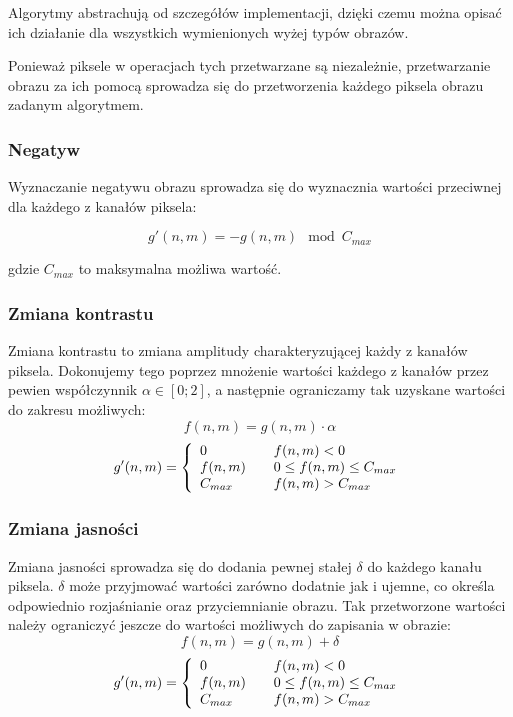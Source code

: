 \documentclass{classrep}
\begin{document}
Algorytmy abstrachują od szczegółów implementacji, dzięki czemu można opisać ich działanie dla wszystkich wymienionych wyżej typów obrazów.

Ponieważ piksele w operacjach tych przetwarzane są niezależnie, przetwarzanie obrazu za ich pomocą sprowadza się do przetworzenia każdego piksela obrazu zadanym algorytmem.

\subsubsection{Negatyw}
Wyznaczanie negatywu obrazu sprowadza się do wyznacznia wartości przeciwnej dla każdego z kanałów piksela:

\begin{equation}
 g'(n, m) = -g(n, m) \mod C_{max}
\end{equation}

gdzie $C_{max}$ to maksymalna możliwa wartość.

\subsubsection{Zmiana kontrastu}
Zmiana kontrastu to zmiana amplitudy charakteryzującej każdy z kanałów piksela. Dokonujemy tego poprzez mnożenie wartości każdego z kanałów przez pewien współczynnik $\alpha \in [0; 2]$, a następnie ograniczamy tak uzyskane wartości do zakresu możliwych:
\begin{equation}
 f(n, m) = g(n, m) \cdot \alpha
\end{equation}
\begin{equation}
 g'(n, m) = \left\{
  \begin{array}{l l}
    0 & \quad f(n, m) < 0 \\
    f(n, m) & \quad 0 \leq f(n, m) \leq C_{max} \\
    C_{max} & \quad f(n, m) > C_{max} \\
  \end{array}
\right.
\end{equation}

\subsubsection{Zmiana jasności}
Zmiana jasności sprowadza się do dodania pewnej stałej $\delta$ do każdego kanału piksela. $\delta$ może przyjmować wartości zarówno dodatnie jak i ujemne, co określa odpowiednio rozjaśnianie oraz przyciemnianie obrazu. Tak przetworzone wartości należy ograniczyć jeszcze do wartości możliwych do zapisania w obrazie:
\begin{equation}
 f(n, m) = g(n, m) + \delta
\end{equation}
\begin{equation}
 g'(n, m) = \left\{
  \begin{array}{l l}
    0 & \quad f(n, m) < 0 \\
    f(n, m) & \quad 0 \leq f(n, m) \leq C_{max} \\
    C_{max} & \quad f(n, m) > C_{max} \\
  \end{array}
\right.
\end{equation}
\end{document}

